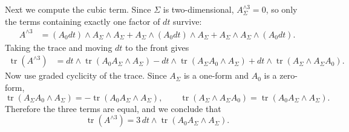 \documentclass[11pt]{article}
\newcommand{\tr}{\operatorname{tr}}
\theoremstyle{definition}
\numberwithin{theorem}{section}
\numberwithin{equation}{section}
\begin{document}
\medskip

\noindent Next we compute the cubic term. Since $\Sigma$ is two-dimensional, $A_\Sigma^{\wedge 3}=0$, so only the terms containing exactly one factor of $dt$ survive:
\begin{align*}
A^{\wedge 3}
&=
(A_0dt)\wedge A_\Sigma\wedge A_\Sigma
+ A_\Sigma\wedge (A_0dt)\wedge A_\Sigma
+ A_\Sigma\wedge A_\Sigma\wedge (A_0dt).
\end{align*}
Taking the trace and moving $dt$ to the front gives
\begin{align*}
\tr(A^{\wedge 3})
&=
dt\wedge \tr(A_0A_\Sigma\wedge A_\Sigma)
- dt\wedge \tr(A_\Sigma A_0\wedge A_\Sigma)
+ dt\wedge \tr(A_\Sigma\wedge A_\Sigma A_0).
\end{align*}
Now use graded cyclicity of the trace. Since $A_\Sigma$ is a one-form and $A_0$ is a zero-form,
\begin{equation*}
\tr(A_\Sigma A_0\wedge A_\Sigma) = -\tr(A_0A_\Sigma\wedge A_\Sigma),
\qquad
\tr(A_\Sigma\wedge A_\Sigma A_0) = \tr(A_0A_\Sigma\wedge A_\Sigma).
\end{equation*}
Therefore the three terms are equal, and we conclude that
\begin{equation}\label{eq:A-cubed-split}
\tr(A^{\wedge 3}) = 3\,dt\wedge \tr(A_0A_\Sigma\wedge A_\Sigma).
\end{equation}

\medskip
\end{document}

